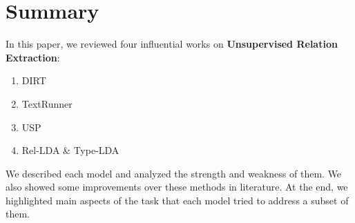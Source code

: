 \documentclass[12pt]{report}
\begin{document}
\section{Summary}
\label{ch:conclusion}

In this paper, we reviewed four influential works on \textbf{Unsupervised Relation Extraction}:
\begin{enumerate}
  \item DIRT
  \item TextRunner
  \item USP
  \item Rel-LDA \& Type-LDA
\end{enumerate}

We described each model and analyzed the strength and weakness of them. We also showed some improvements over these
 methods in literature. At the end, we highlighted main aspects of the task that each model tried to address a subset of them.
 






\pagebreak

\begin{footnotesize}

%

\end{footnotesize}
\end{document}
